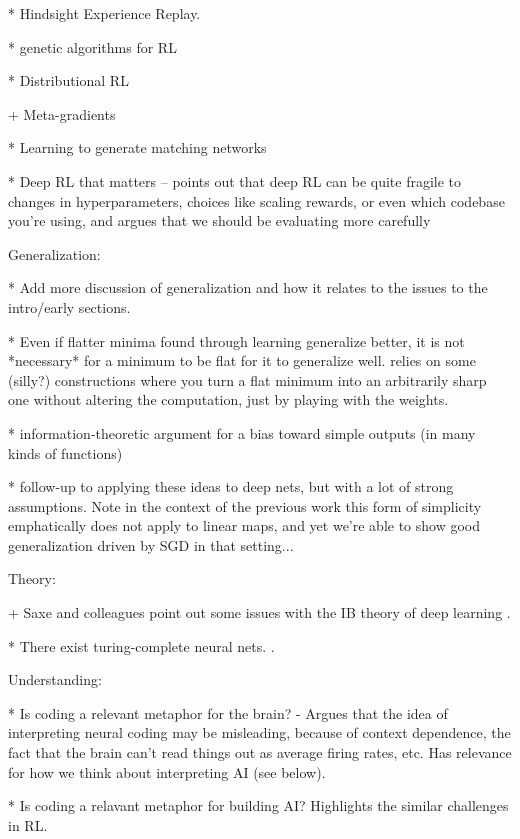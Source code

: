 * Hindsight Experience Replay. \citep{Andrychowicz2017}

* genetic algorithms for RL \citep{Petroski2018}

* Distributional RL \citep{Bellemare2017}

+ Meta-gradients \citep{Xu2018a}

* Learning to generate matching networks \citep{Li2019a}

* Deep RL that matters -- points out that deep RL can be quite fragile to changes in hyperparameters, choices like scaling rewards, or even which codebase you're using, and argues that we should be evaluating more carefully \citep{Henderson2018}


Generalization:

* Add more discussion of generalization and how it relates to the issues to the intro/early sections.

* Even if flatter minima found through learning generalize better, it is not *necessary* for a minimum to be flat for it to generalize well. relies on some (silly?) constructions where you turn a flat minimum into an arbitrarily sharp one without altering the computation, just by playing with the weights. \citep{Dinh2017} 

* information-theoretic argument for a bias toward simple outputs (in many kinds of functions) \citep{Dingle2018}

* follow-up to \citep{Dingle2018} applying these ideas to deep nets, but with a lot of strong assumptions. \citep{Perez2019} Note in the context of the previous work this form of simplicity emphatically does not apply to linear maps, and yet we're able to show good generalization driven by SGD in that setting...  


Theory:

+ Saxe and colleagues point out some issues with the IB theory of deep learning \citep{Saxe2018a}.

* There exist turing-complete neural nets. \citep{Siegelman1992}.


Understanding:

* Is coding a relevant metaphor for the brain? - Argues that the idea of interpreting neural coding may be misleading, because of context dependence, the fact that the brain can't read things out as average firing rates, etc. Has relevance for how we think about interpreting AI (see below). \citep{Brette2019} 

* Is coding a relavant metaphor for building AI? Highlights the similar challenges in RL. \citep{Santoro2019}

